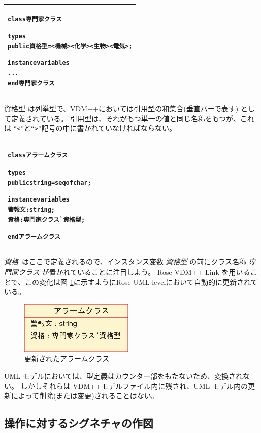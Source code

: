 \documentclass[\pformat,12pt,twoside]{jarticle}
\newenvironment{VDMgray}%
{\begin{tabular}{|G|}\hline\small\begin{alltt}}%
{\end{alltt}\normalsize\\
 \hline\end{tabular}}
\begin{document}
\begin{VDMgray}
class 専門家クラス

types
 public 資格型 = \texttt{<}機械\texttt{>} {\textbar} \texttt{<}化学\texttt{>} {\textbar} \texttt{<}生物\texttt{>} {\textbar} \texttt{<}電気\texttt{>};

instance variables 
...
end 専門家クラス

\end{VDMgray}


資格型 は列挙型で、VDM++においては引用型の和集合(垂直バーで表す) として定義されている。
引用型は、それがもつ単一の値と同じ名称をもつが、これは ``\texttt{<}''と``\texttt{>}''記号の中に書かれていなければならない。

\begin{VDMgray}
class アラームクラス

types
 public string = seq of char;

instance variables 
 警報文 : string;
 資格 : 専門家クラス\`{}資格型;

end アラームクラス

\end{VDMgray}


\emph{資格}\ はここで定義されるので、インスタンス変数 \emph{資格型} の前にクラス名称 \emph{専門家クラス} が置かれていることに注目しよう。
Rose-VDM++ Link を用いることで、この変化は図‾\ref{fig:updatedalarm}に示すようにRose UML levelにおいて自動的に更新されている。

\begin{figure}[htbp]
\begin{center}
\includegraphics[width=2.120in]{updatedalarm}
\caption{更新されたアラームクラス \label{fig:updatedalarm}}
\end{center}
\end{figure}

UML モデルにおいては、型定義はカウンター部をもたないため、変換されない。
しかしそれらは VDM++モデルファイル内に残され、UML モデル内の更新によって削除(または変更)されることはない。

\subsection{操作に対するシグネチャの作図}
\end{document}
